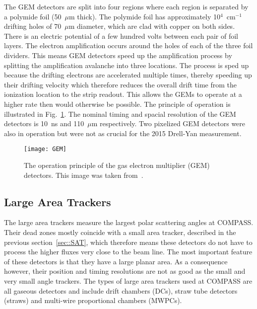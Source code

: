 The GEM detectors are split into four regions where each region is separated by
a polymide foil (50~$\mu$m thick).  The polymide foil has approximately
10$^4$~cm$^{-1}$ drifting holes of 70~$\mu$m diameter, which are clad with
copper on both sides.  There is an electric potential of a few hundred volts
between each pair of foil layers.  The electron amplification occurs around the
holes of each of the three foil dividers.  This means GEM detectors speed up the
amplification process by splitting the amplification avalanche into three
locations.  The process is sped up because the drifting electrons are
accelerated multiple times, thereby speeding up their drifting velocity which
therefore reduces the overall drift time from the ionization location to the
strip readout.  This allows the GEMs to operate at a higher rate then would
otherwise be possible.  The principle of operation is illustrated in
Fig.~\ref{fig::GEM}.  The nominal timing and spacial resolution of the GEM
detectors is 10~ns and 110~$\mu$m respectively.  Two pixelized GEM detectors
were also in operation but were not as crucial for the 2015 Drell-Yan
measurement.

\begin{figure}[h!t]
  \centering
  \texttt{[image: GEM]}
  \caption{The operation principle of the gas electron multiplier (GEM)
    detectors.  This image was taken from~\cite{compassSpec}.}
  \label{fig::GEM}
\end{figure}

\subsection{Large Area Trackers}
The large area trackers measure the largest polar scattering angles at COMPASS.
Their dead zones mostly coincide with a small area tracker, described in the
previous section~\ref{sec::SAT}, which therefore means these detectors do not
have to process the higher fluxes very close to the beam line.  The most
important feature of these detectors is that they have a large planar area. As a
consequence however, their position and timing resolutions are not as good as
the small and very small angle trackers.  The types of large area trackers used
at COMPASS are all gaseous detectors and include drift chambers (DCs), straw
tube detectors (straws) and multi-wire proportional chambers (MWPCs). \par

